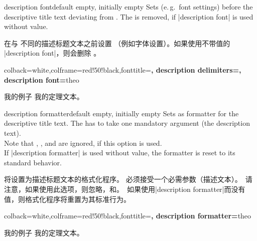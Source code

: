 \begin{docTcbKey}{description font}{}{default empty, initially empty}
Sets  (e.\,g.\ font settings) before the descriptive title text deviating from .
The  is removed, if |description font| is used without value.

在与  不同的描述标题文本之前设置 （例如字体设置）。如果使用不带值的 |description font|，则会删除 。
\begin{dispExample}
%
  {colback=white,colframe=red!50!black,fonttitle=\bfseries,
   description delimiters={\glqq}{\grqq},
   description font=\mdseries\itshape}{theo}
\begin{sometheorem}{我的例子}{}
我的定理文本。
\end{sometheorem}
\end{dispExample}
\end{docTcbKey}


\begin{docTcbKey}{description formatter}{}{default empty, initially empty}
Sets  as formatter for the descriptive title text. The 
has to take one mandatory argument (the description text).\\ 
Note that , ,
and  are ignored, if this option is used.\\
If |description formatter| is used without value, the formatter is reset
to its standard behavior.

将设置为描述标题文本的格式化程序。 必须接受一个必需参数（描述文本）。\ 请注意，如果使用此选项，则忽略，和。\ 如果使用|description formatter|而没有值，则格式化程序将重置为其标准行为。
\begin{dispExample}

%
  {colback=white,colframe=red!50!black,fonttitle=\bfseries,
   description formatter=\formbox}{theo}
\begin{sometheorem}{我的例子}{}
我的定理文本。
\end{sometheorem}
\end{dispExample}
\end{docTcbKey}


